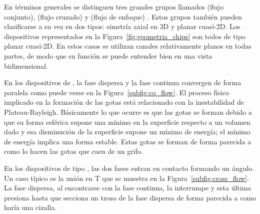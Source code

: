 
En términos generales se distinguen tres grandes grupos llamados  (flujo conjunto),  (flujo cruzado) y  (flujo de enfoque) \citep{article:pingan}. Estos grupos también pueden clasificarse a su vez en dos tipos: simetría axial en 3D y planar cuasi-2D. Los dispositivos representados en la Figura~\ref{fig:geometria_chips} son todos de tipo planar cuasi-2D. En estos casos se utilizan canales relativamente planos en todas partes, de modo que su función se puede entender bien en una vista bidimensional.

En los dispositivos de , la fase dispersa y la fase continua convergen de forma paralela como puede verse en la Figura~\ref{subfig:co_flow}. El proceso físico implicado en la formación de las gotas está relacionado con la inestabilidad de Plateau-Rayleigh. Básicamente lo que ocurre es que las gotas se forman debido a que su forma esférica supone una mínimo en la superficie respecto a un volumen dado y esa disminución de la superficie supone un mínimo de energía; el mínimo de energía implica una forma estable. Estas gotas se forman de forma parecida a como lo hacen las gotas que caen de un grifo.

En los dispositivos de tipo , las dos fases entran en contacto formando un ángulo. Un caso típico es la unión en T que se muestra en la Figura~\ref{subfig:cross_flow}. La fase dispersa, al encontrarse con la fase continua, la interrumpe y esta última presiona hasta que secciona un trozo de la fase dispersa de forma parecida a como haría una cizalla.




